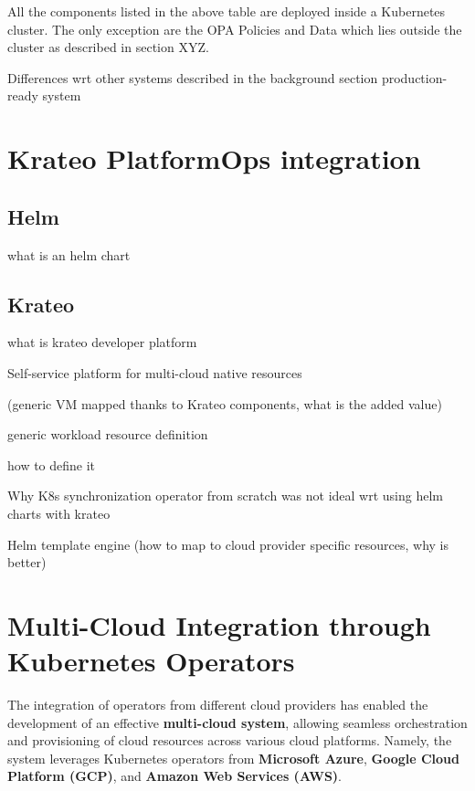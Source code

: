 All the components listed in the above table are deployed inside a Kubernetes cluster. The only exception are the OPA Policies and Data which lies outside the cluster as described in section XYZ.


Differences wrt other systems described in the background section
production-ready system





\section{Krateo PlatformOps integration}

\subsection{Helm}
what is an helm chart


\subsection{Krateo}
what is krateo
developer platform


Self-service platform for multi-cloud native resources



(generic VM mapped thanks to Krateo components, what is the added value)




generic workload resource definition


how to define it

Why K8s synchronization operator from scratch was not ideal wrt using helm charts with krateo

Helm template engine (how to map to cloud provider specific resources, why is better)







\section{Multi-Cloud Integration through Kubernetes Operators}

The integration of operators from different cloud providers has enabled the development of an effective \textbf{multi-cloud system}, allowing seamless orchestration and provisioning of cloud resources across various cloud platforms. Namely, the system leverages Kubernetes operators from \textbf{Microsoft Azure}, \textbf{Google Cloud Platform (GCP)}, and \textbf{Amazon Web Services (AWS)}.


